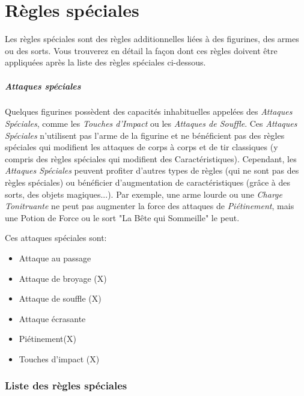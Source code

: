 
\part{Règles spéciales}

Les règles spéciales sont des règles additionnelles liées à des figurines, des armes ou des sorts. Vous trouverez en détail la façon dont ces règles doivent être appliquées après la liste des règles spéciales ci-dessous.


\subsubsection*{Attaques spéciales}

Quelques figurines possèdent des capacités inhabituelles appelées des \emph{Attaques Spéciales}, comme les \emph{Touches d'Impact} ou les \emph{Attaques de Souffle}. Ces \emph{Attaques Spéciales} n'utilisent pas l'arme de la figurine et ne bénéficient pas des règles spéciales qui modifient les attaques de corps à corps et de tir classiques (y compris des règles spéciales qui modifient des Caractéristiques). Cependant, les \emph{Attaques Spéciales} peuvent profiter d'autres types de règles (qui ne sont pas des règles spéciales) ou bénéficier d'augmentation de caractéristiques (grâce à des sorts, des objets magiques...). Par exemple, une arme lourde ou une \emph{Charge Tonitruante} ne peut pas augmenter la force des attaques de \emph{Piétinement}, mais une Potion de Force ou le sort "La Bête qui Sommeille" le peut.

Ces attaques spéciales sont:
\begin{itemize}
\item Attaque au passage
\item Attaque de broyage (X)
\item Attaque de souffle (X)
\item Attaque écrasante
\item Piétinement(X)
\item Touches d'impact (X) 
\end{itemize} 

\section{Liste des règles spéciales} 


